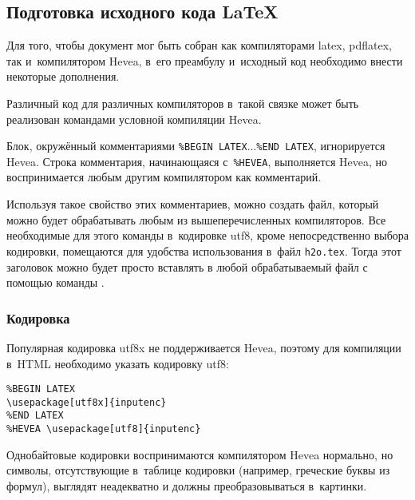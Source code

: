\documentclass[10pt, a5paper]{article}
\begin{document}
\subsection*{Подготовка исходного кода \LaTeX}

Для того, чтобы документ мог быть собран как компиляторами latex, pdflatex, так и~компилятором Hevea, в~его преамбулу и~исходный код необходимо внести некоторые дополнения.

Различный код для различных компиляторов в~такой связке может быть реализован командами условной компиляции Hevea.

Блок, окружённый комментариями \verb!%BEGIN LATEX!...\verb!%END LATEX!, игнорируется Hevea.
Строка комментария, начинающаяся с~\verb!%HEVEA!, выполняется Hevea, но воспринимается любым другим компилятором как комментарий.

Используя такое свойство этих комментариев, можно создать
файл, который можно будет обрабатывать любым из вышеперечисленных компиляторов.
Все необходимые для этого команды в~кодировке utf8, кроме непосредственно выбора кодировки, помещаются для удобства использования в~файл \verb!h2o.tex!. Тогда этот заголовок можно будет просто вставлять в любой обрабатываемый файл с помощью команды \verb!!.

\subsubsection*{Кодировка}

Популярная кодировка utf8x не поддерживается Hevea, поэтому для компиляции в~HTML необходимо указать кодировку utf8:
\begin{verbatim}
%BEGIN LATEX
\usepackage[utf8x]{inputenc}
%END LATEX
%HEVEA \usepackage[utf8]{inputenc}
\end{verbatim}

Однобайтовые кодировки воспринимаются компилятором Hevea нормально, но символы, отсутствующие в~таблице кодировки (например, греческие буквы из формул), выглядят неадекватно и \linebreak должны преобразовываться в~картинки.

% 
% 
\end{document}
